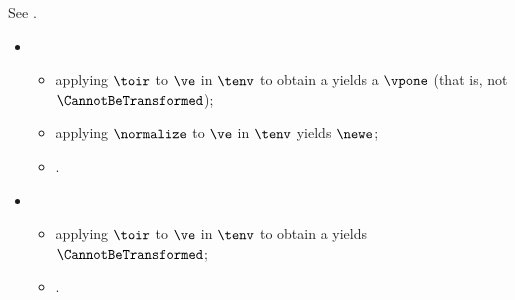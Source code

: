 See .

\ProseParagraph
\OneApplies
\begin{itemize}
  \item {}
  \begin{itemize}
    \item applying $\toir$ to $\ve$ in $\tenv$ to obtain a \symbolicexpressionterm{} yields a \symbolicexpressionterm{} $\vpone$
    (that is, not $\CannotBeTransformed$)\ProseOrTypeError;
    \item applying $\normalize$ to $\ve$ in $\tenv$ yields $\newe$;
    \item \Proseeqdef{$\neweopt$}{$\some{\newe}$}.
  \end{itemize}

  \item {}
  \begin{itemize}
    \item applying $\toir$ to $\ve$ in $\tenv$ to obtain a \symbolicexpressionterm{} yields $\CannotBeTransformed$;
    \item \Proseeqdef{$\neweopt$}{$\None$}.
  \end{itemize}
\end{itemize}

\FormallyParagraph
{}
